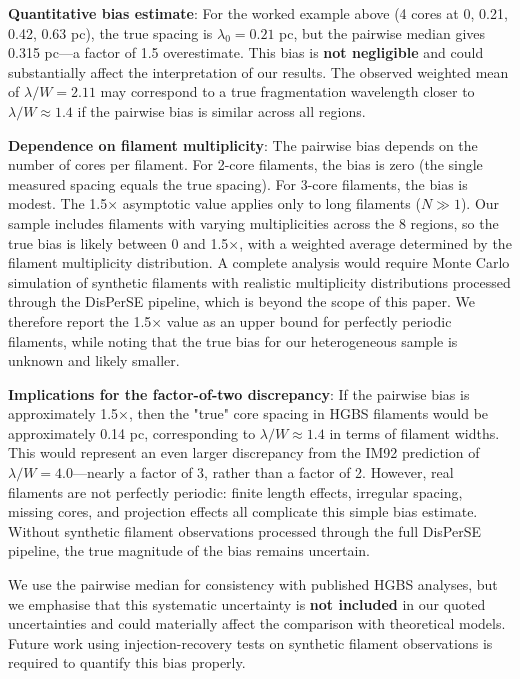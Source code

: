 \documentclass[11pt,a4paper]{article}
\begin{document}
\textbf{Quantitative bias estimate}: For the worked example above (4 cores at 0, 0.21, 0.42, 0.63 pc), the true spacing is $\lambda_0 = 0.21$ pc, but the pairwise median gives 0.315 pc—a factor of 1.5 overestimate. This bias is \textbf{not negligible} and could substantially affect the interpretation of our results. The observed weighted mean of $\lambda/W = 2.11$ may correspond to a true fragmentation wavelength closer to $\lambda/W \approx 1.4$ if the pairwise bias is similar across all regions.

\textbf{Dependence on filament multiplicity}: The pairwise bias depends on the number of cores per filament. For 2-core filaments, the bias is zero (the single measured spacing equals the true spacing). For 3-core filaments, the bias is modest. The 1.5× asymptotic value applies only to long filaments ($N \gg 1$). Our sample includes filaments with varying multiplicities across the 8 regions, so the true bias is likely between 0 and 1.5×, with a weighted average determined by the filament multiplicity distribution. A complete analysis would require Monte Carlo simulation of synthetic filaments with realistic multiplicity distributions processed through the DisPerSE pipeline, which is beyond the scope of this paper. We therefore report the 1.5× value as an upper bound for perfectly periodic filaments, while noting that the true bias for our heterogeneous sample is unknown and likely smaller.

\textbf{Implications for the factor-of-two discrepancy}: If the pairwise bias is approximately 1.5×, then the "true" core spacing in HGBS filaments would be approximately 0.14 pc, corresponding to $\lambda/W \approx 1.4$ in terms of filament widths. This would represent an even larger discrepancy from the IM92 prediction of $\lambda/W = 4.0$—nearly a factor of 3, rather than a factor of 2. However, real filaments are not perfectly periodic: finite length effects, irregular spacing, missing cores, and projection effects all complicate this simple bias estimate. Without synthetic filament observations processed through the full DisPerSE pipeline, the true magnitude of the bias remains uncertain.

We use the pairwise median for consistency with published HGBS analyses, but we emphasise that this systematic uncertainty is \textbf{not included} in our quoted uncertainties and could materially affect the comparison with theoretical models. Future work using injection-recovery tests on synthetic filament observations is required to quantify this bias properly.
\end{document}
